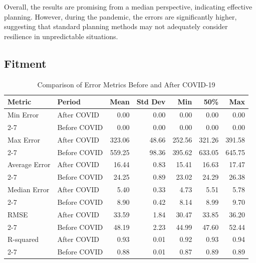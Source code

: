 \documentclass[12pt]{report}
\begin{document}
Overall, the results are promising from a median perspective, indicating effective planning. However, during the pandemic, the errors are significantly higher, suggesting that standard planning methods may not adequately consider resilience in unpredictable situations.

\subsection{Fitment}

\begin{table}[h!]
\centering
\begin{tabular}{|l|l|r|r|r|r|r|}
\hline
\textbf{Metric} & \textbf{Period} & \textbf{Mean} & \textbf{Std Dev} & \textbf{Min} & \textbf{50\%} & \textbf{Max} \\ \hline
Min Error & After COVID & 0.00 & 0.00 & 0.00 & 0.00 & 0.00 \\ \cline{2-7}
 & Before COVID & 0.00 & 0.00 & 0.00 & 0.00 & 0.00 \\ \hline
Max Error & After COVID & 323.06 & 48.66 & 252.56 & 321.26 & 391.58 \\ \cline{2-7}
 & Before COVID & 559.25 & 98.36 & 395.62 & 633.05 & 645.75 \\ \hline
Average Error & After COVID & 16.44 & 0.83 & 15.41 & 16.63 & 17.47 \\ \cline{2-7}
 & Before COVID & 24.25 & 0.89 & 23.02 & 24.29 & 26.38 \\ \hline
Median Error & After COVID & 5.40 & 0.33 & 4.73 & 5.51 & 5.78 \\ \cline{2-7}
 & Before COVID & 8.90 & 0.42 & 8.14 & 8.99 & 9.70 \\ \hline
RMSE & After COVID & 33.59 & 1.84 & 30.47 & 33.85 & 36.20 \\ \cline{2-7}
 & Before COVID & 48.19 & 2.23 & 44.99 & 47.60 & 52.44 \\ \hline
R-squared & After COVID & 0.93 & 0.01 & 0.92 & 0.93 & 0.94 \\ \cline{2-7}
 & Before COVID & 0.88 & 0.01 & 0.87 & 0.89 & 0.89 \\ \hline
\end{tabular}
\caption{Comparison of Error Metrics Before and After COVID-19}
\label{table:before_and_after}
\end{table}
\end{document}
